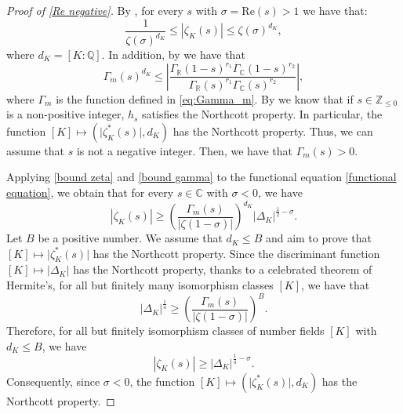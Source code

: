 \documentclass[10pt,a4paper]{amsart}
\theoremstyle{plain}
\theoremstyle{definition}
\theoremstyle{remark}
\newcommand{\Q}{\mathbb{Q}}
\newcommand{\R}{\mathbb{R}}
\newcommand{\C}{\mathbb{C}}
\begin{document}
    \begin{proof}[Proof of \cref{Re negative}]
    By \cite[Lemma 3.1]{GeLa24}, for every $s$ with $\sigma=\mathrm{Re}(s)>1$ we have that:
    \begin{equation}\label{bound zeta}
    \frac{1}{\zeta(\sigma)^{d_K}}\leq |\zeta_K(s)|\leq \zeta(\sigma)^{d_K},
    \end{equation}
    where $d_K=[K:\Q]$. In addition, by \cite[Lemma 4.3]{GeLa24} we have that
    \begin{equation}\label{bound gamma}
    \Gamma_{m}(s)^{d_K}\leq\left|\frac{\Gamma_\R(1 - s)^{r_1} \Gamma_\C(1 - s)^
{r_2}}{\Gamma_\R(s)^{r_1} \Gamma_\C(s)^{r_2}
}\right|,    
    \end{equation}
    where $\Gamma_m$ is the function defined in \eqref{eq:Gamma_m}.
    By \cite[Theorem 1.2]{Pazuki_Pengo_2024} we know that if $s \in \mathbb{Z}_{\leq 0}$ is a non-positive integer, $h_s$ satisfies the Northcott property. In particular, the function $[K]\mapsto \left(\lvert\zeta_K^\ast(s) \rvert, d_K\right)$ has the Northcott property. Thus, we can assume that $s$ is not a negative integer. Then, we have that $\Gamma_{m}(s)>0$.
    
     Applying \eqref{bound zeta} and \eqref{bound gamma} to the functional equation \eqref{functional equation}, we obtain that for every $s\in \C$ with $\sigma<0$, we have
    \[
|\zeta_K(s)|\geq \left(\frac{\Gamma_{m}(s)}{|\zeta(1-\sigma)|}\right)^{d_K}|\Delta_K|^{\frac{1}{2}-\sigma}.
    \]
    Let $B$ be a positive number. We assume that $d_K\leq B$ and aim to prove that $[K]\mapsto \lvert\zeta_K^\ast(s) \rvert$ has the Northcott property. 
    Since the discriminant function $[K]\mapsto \lvert\Delta_K \rvert$ has the Northcott property, thanks to a celebrated theorem of Hermite's, for all but finitely many isomorphism classes $[K]$, we have that
    \[
    |\Delta_K|^{\frac{1}{4}}\geq \left(\frac{\Gamma_{m}(s)}{|\zeta(1-\sigma)|}\right)^{B}.
    \]
    Therefore, for all but finitely isomorphism classes of number fields $[K]$ with $d_K\leq B$, we have
    \[
|\zeta_K(s)|\geq |\Delta_K|^{\frac{1}{4}-\sigma}.
    \]
    Consequently, since $\sigma< 0$, the function $[K]\mapsto \left(\lvert\zeta_K^\ast(s) \rvert, d_K\right)$ has the Northcott property.
    \end{proof}

\printbibliography
\end{document}
